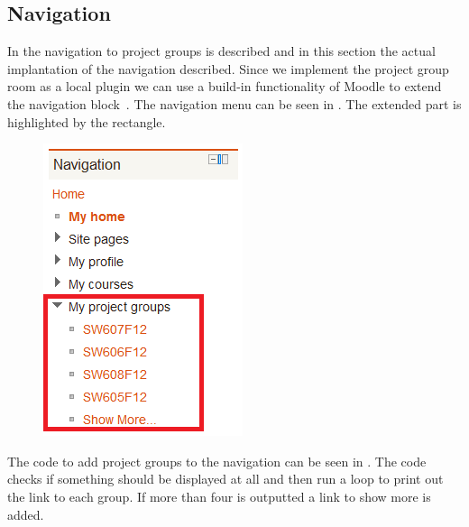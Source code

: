 	
	






\subsection{Navigation}
In  the navigation to project groups is described and in this section the actual implantation of the navigation described. 
Since we implement the project group room as a local plugin we can use a build-in functionality of Moodle to extend the navigation block~\cite{moodleextendnavigationblock}.
The navigation menu can be seen in . The extended part is highlighted by the rectangle. 

\begin{figure}
	\centering
		\includegraphics[scale=0.7]{images/moodlenavigationblock.png}
	\label{fig:moodlenavigationblock}
\end{figure}

The code to add project groups to the navigation can be seen in .
The code checks if something should be displayed at all and then run a loop to print out the link to each group. 
If more than four is outputted a link to show more is added. 


